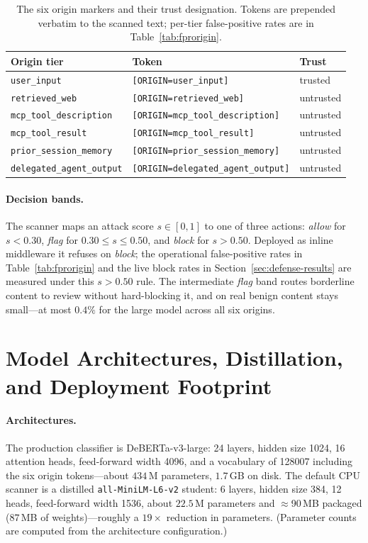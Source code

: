 \documentclass{article}
\begin{document}
\begin{table}[h]
\centering
\small
\caption{The six origin markers and their trust designation. Tokens are prepended verbatim to the scanned text; per-tier false-positive rates are in Table~\ref{tab:fprorigin}.}
\label{tab:origintok}
\begin{tabular}{lll}
\toprule
\textbf{Origin tier} & \textbf{Token} & \textbf{Trust} \\
\midrule
\texttt{user\_input} & \texttt{[ORIGIN=user\_input]} & trusted \\
\texttt{retrieved\_web} & \texttt{[ORIGIN=retrieved\_web]} & untrusted \\
\texttt{mcp\_tool\_description} & \texttt{[ORIGIN=mcp\_tool\_description]} & untrusted \\
\texttt{mcp\_tool\_result} & \texttt{[ORIGIN=mcp\_tool\_result]} & untrusted \\
\texttt{prior\_session\_memory} & \texttt{[ORIGIN=prior\_session\_memory]} & untrusted \\
\texttt{delegated\_agent\_output} & \texttt{[ORIGIN=delegated\_agent\_output]} & untrusted \\
\bottomrule
\end{tabular}
\end{table}

\paragraph{Decision bands.} The scanner maps an attack score $s \in [0,1]$ to one of three actions: \emph{allow} for $s < 0.30$, \emph{flag} for $0.30 \le s \le 0.50$, and \emph{block} for $s > 0.50$. Deployed as inline middleware it refuses on \emph{block}; the operational false-positive rates in Table~\ref{tab:fprorigin} and the live block rates in Section~\ref{sec:defense-results} are measured under this $s > 0.50$ rule. The intermediate \emph{flag} band routes borderline content to review without hard-blocking it, and on real benign content stays small---at most $0.4\%$ for the large model across all six origins.

\section{Model Architectures, Distillation, and Deployment Footprint}

\paragraph{Architectures.} The production classifier is DeBERTa-v3-large: 24 layers, hidden size 1024, 16 attention heads, feed-forward width 4096, and a vocabulary of 128007 including the six origin tokens---about $434$\,M parameters, $1.7$\,GB on disk. The default CPU scanner is a distilled \texttt{all-MiniLM-L6-v2} student: 6 layers, hidden size 384, 12 heads, feed-forward width 1536, about $22.5$\,M parameters and $\approx$90\,MB packaged ($87$\,MB of weights)---roughly a $19\times$ reduction in parameters. (Parameter counts are computed from the architecture configuration.)
\end{document}
